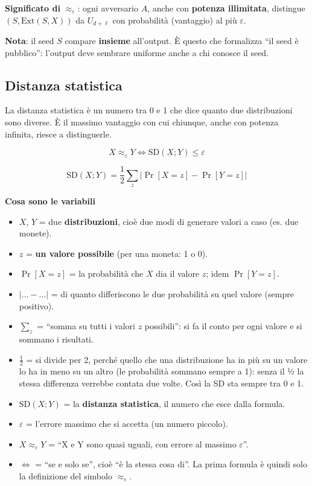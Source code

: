 \textbf{Significato di} \(\approx_\varepsilon\): ogni avversario \(A\), anche con \textbf{potenza illimitata}, distingue \((S, \text{Ext}(S, X))\) da \(U_{d+\ell}\) con probabilità (vantaggio) al più \(\varepsilon\).

\textbf{Nota}: il seed \(S\) compare \textbf{insieme} all'output. È questo che formalizza ``il seed è pubblico'': l'output deve sembrare uniforme anche a chi conosce il seed.

\subsection{Distanza statistica}

\begin{inbreve}

La distanza statistica è un numero tra 0 e 1 che dice quanto due distribuzioni sono diverse. È il massimo vantaggio con cui chiunque, anche con potenza infinita, riesce a distinguerle.

\end{inbreve}

\[
X \approx_\varepsilon Y \iff \text{SD}(X; Y) \le \varepsilon
\]

\[
\text{SD}(X; Y) = \frac{1}{2} \sum_z \Big| \Pr[X = z] - \Pr[Y = z] \Big|
\]

\begin{nota}

\textbf{Cosa sono le variabili}

\begin{itemize}
\tightlist
\item
  \(X\), \(Y\) = due \textbf{distribuzioni}, cioè due modi di generare valori a caso (es. due monete).
\item
  \(z\) = \textbf{un valore possibile} (per una moneta: 1 o 0).
\item
  \(\Pr[X = z]\) = la probabilità che \(X\) dia il valore \(z\); idem \(\Pr[Y = z]\).
\item
  \(|\dots - \dots|\) = di quanto differiscono le due probabilità su quel valore (sempre positivo).
\item
  \(\sum_z\) = ``somma su tutti i valori \(z\) possibili'': si fa il conto per ogni valore e si sommano i risultati.
\item
  \(\frac{1}{2}\) = si divide per 2, perché quello che una distribuzione ha in più su un valore lo ha in meno su un altro (le probabilità sommano sempre a 1): senza il ½ la stessa differenza verrebbe contata due volte. Così la SD sta sempre tra 0 e 1.
\item
  \(\text{SD}(X; Y)\) = la \textbf{distanza statistica}, il numero che esce dalla formula.
\item
  \(\varepsilon\) = l'errore massimo che si accetta (un numero piccolo).
\item
  \(X \approx_\varepsilon Y\) = ``X e Y sono quasi uguali, con errore al massimo \(\varepsilon\)''.
\item
  \(\iff\) = ``se e solo se'', cioè ``è la stessa cosa di''. La prima formula è quindi solo la definizione del simbolo \(\approx_\varepsilon\).
\end{itemize}

\end{nota}

